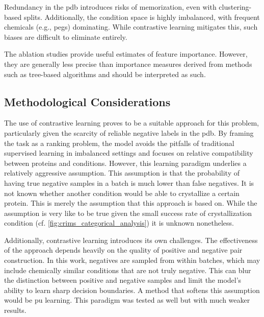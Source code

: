 Redundancy in the \gls{pdb} introduces risks of memorization, even with clustering-based splits. Additionally, the condition space is highly imbalanced, with frequent chemicals (e.g., \glspl{peg}) dominating. While contrastive learning mitigates this, such biases are difficult to eliminate entirely.

The ablation studies provide useful estimates of feature importance. However, they are generally less precise than importance measures derived from methods such as tree-based algorithms and should be interpreted as such. 

\subsection*{Methodological Considerations}

The use of contrastive learning proves to be a suitable approach for this problem, particularly given the scarcity of reliable negative labels in the \gls{pdb}. By framing the task as a ranking problem, the model avoids the pitfalls of traditional supervised learning in imbalanced settings and focuses on relative compatibility between proteins and conditions. However, this learning paradigm underlies a relatively aggressive assumption. This assumption is that the probability of having true negative samples in a batch is much lower than false negatives. It is not known whether another condition would be able to crystallize a certain protein. This is merely the assumption that this approach is based on. While the assumption is very like to be true given the small success rate of crystallization condition (cf. \autoref{fig:crims_categorical_analysis}) it is unknown nonetheless. 

Additionally, contrastive learning introduces its own challenges. The effectiveness of the approach depends heavily on the quality of positive and negative pair construction. In this work, negatives are sampled from within batches, which may include chemically similar conditions that are not truly negative. This can blur the distinction between positive and negative samples and limit the model’s ability to learn sharp decision boundaries. A method that softens this assumption would be \gls{pu} learning. This paradigm was tested as well but with much weaker results. 

